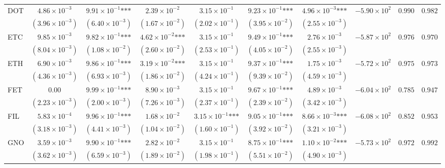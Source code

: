 \documentclass{article}
\begin{document}
\begin{landscape}
\begin{longtable}{lccccccccc}
DOT & $4.86\times 10^{-3}$ & $9.91\times 10^{-1}\text{***}$ & $2.39\times 10^{-2}$ & $3.15\times 10^{-1}$ & $9.23\times 10^{-1}\text{***}$ & $4.96\times 10^{-3}\text{***}$ & $-5.90\times 10^{2}$ & $0.990$ & $0.982$ \\
 & $(3.96\times 10^{-3})$ & $(6.40\times 10^{-3})$ & $(1.67\times 10^{-2})$ & $(2.02\times 10^{-1})$ & $(3.95\times 10^{-2})$ & $(2.55\times 10^{-3})$ &  &  &  \\
ETC & $9.85\times 10^{-3}$ & $9.82\times 10^{-1}\text{***}$ & $4.62\times 10^{-2}\text{***}$ & $3.15\times 10^{-1}$ & $9.49\times 10^{-1}\text{***}$ & $2.76\times 10^{-3}$ & $-5.87\times 10^{2}$ & $0.976$ & $0.970$ \\
 & $(8.04\times 10^{-3})$ & $(1.08\times 10^{-2})$ & $(2.60\times 10^{-2})$ & $(2.53\times 10^{-1})$ & $(4.05\times 10^{-2})$ & $(2.55\times 10^{-3})$ &  &  &  \\
ETH & $6.90\times 10^{-3}$ & $9.86\times 10^{-1}\text{***}$ & $3.19\times 10^{-2}\text{***}$ & $3.15\times 10^{-1}$ & $9.37\times 10^{-1}\text{***}$ & $1.75\times 10^{-3}$ & $-5.72\times 10^{2}$ & $0.975$ & $0.973$ \\
 & $(4.36\times 10^{-3})$ & $(6.93\times 10^{-3})$ & $(1.86\times 10^{-2})$ & $(4.24\times 10^{-1})$ & $(9.39\times 10^{-2})$ & $(4.59\times 10^{-3})$ &  &  &  \\
FET & $0.00$ & $9.99\times 10^{-1}\text{***}$ & $8.90\times 10^{-3}$ & $3.15\times 10^{-1}$ & $9.67\times 10^{-1}\text{***}$ & $4.89\times 10^{-3}$ & $-6.04\times 10^{2}$ & $0.785$ & $0.947$ \\
 & $(2.23\times 10^{-3})$ & $(2.00\times 10^{-3})$ & $(7.26\times 10^{-3})$ & $(2.37\times 10^{-1})$ & $(2.39\times 10^{-2})$ & $(3.42\times 10^{-3})$ &  &  &  \\
FIL & $5.83\times 10^{-4}$ & $9.96\times 10^{-1}\text{***}$ & $1.68\times 10^{-2}$ & $3.15\times 10^{-1}\text{***}$ & $9.05\times 10^{-1}\text{***}$ & $8.66\times 10^{-3}\text{***}$ & $-6.08\times 10^{2}$ & $0.852$ & $0.953$ \\
 & $(3.18\times 10^{-3})$ & $(4.41\times 10^{-3})$ & $(1.04\times 10^{-2})$ & $(1.60\times 10^{-1})$ & $(3.92\times 10^{-2})$ & $(3.21\times 10^{-3})$ &  &  &  \\
GNO & $3.59\times 10^{-3}$ & $9.90\times 10^{-1}\text{***}$ & $2.82\times 10^{-2}$ & $3.15\times 10^{-1}$ & $8.75\times 10^{-1}\text{***}$ & $1.10\times 10^{-2}\text{***}$ & $-5.73\times 10^{2}$ & $0.972$ & $0.992$ \\
 & $(3.62\times 10^{-3})$ & $(6.59\times 10^{-3})$ & $(1.89\times 10^{-2})$ & $(1.98\times 10^{-1})$ & $(5.51\times 10^{-2})$ & $(4.90\times 10^{-3})$ &  &  &  \\

\end{longtable}
\end{landscape}
\end{document}
